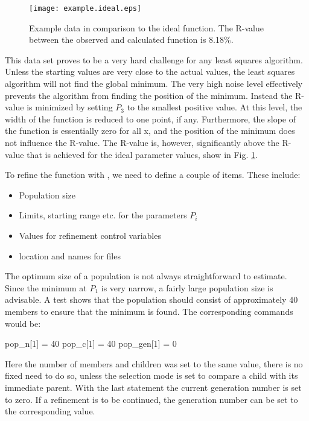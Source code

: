 \begin{figure}
   \texttt{[image: example.ideal.eps]}
   \caption{Example data in comparison to the ideal function. The
    R-value between the observed and calculated function is 8.18\%.}
   \label{fexa-ideal}
\end{figure}

This data set proves to be a very hard challenge for any least squares
algorithm. Unless the starting values are very close to the actual
values, the least squares algorithm will not find the global minimum.
The very high noise level effectively prevents the algorithm from
finding the position of the minimum. Instead the R-value is minimized
by setting $P_{3}$ to the smallest positive value. At this level, the
width of the function is reduced to one point, if any. Furthermore, the
slope of the function is essentially zero for all x, and the position of
the minimum does not influence the R-value. The R-value is, however,
significantly above the R-value that is achieved for the ideal 
parameter values, show in Fig. \ref{fexa-ideal}.

To refine the function with \diffev, we need to define a couple of
items. These include:
\begin{itemize}
  \item Population size
  \item Limits, starting range etc. for the parameters $P_{i}$
  \item Values for refinement control variables
  \item location and names for files
\end{itemize}

The optimum size of a population is not always straightforward to
estimate. Since the minimum at $P_{1}$ is very narrow, a fairly 
large population size is advisable. A test shows that the population
should consist of approximately 40 members to ensure that the 
minimum is found.  The corresponding commands would be:
\begin{MacVerbatim}
  pop_n[1]   = 40
  pop_c[1]   = 40
  pop_gen[1] =  0
\end{MacVerbatim}
Here the number of members and children was set to the same value,
there is no fixed need to do so, unless the selection mode is set 
to compare a child with its immediate parent. With the last statement
the current generation number is set to zero. If a refinement is to 
be continued, the generation number can be set to the corresponding 
value.

